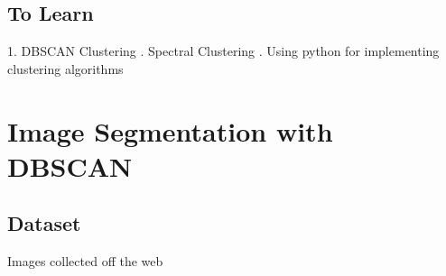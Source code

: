 \documentclass{article}
\begin{document}
\subsection*{To Learn}
1. DBSCAN Clustering
. Spectral Clustering
. Using python for implementing clustering algorithms

\section*{Image Segmentation with DBSCAN}
\subsection*{Dataset}
Images collected off the web
\end{document}
